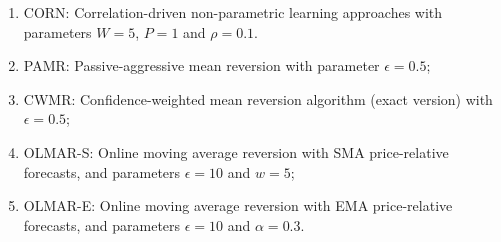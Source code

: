 \begin{enumerate}
  \item CORN: Correlation-driven non-parametric learning approaches \citep{corn} with parameters $W = 5$, $P = 1$ and $\rho = 0.1$.
  \item PAMR: Passive-aggressive mean reversion \citep{pamr} with parameter $\epsilon=0.5$;
  \item CWMR: Confidence-weighted mean reversion \citep{cwmr} algorithm (exact version) with $\epsilon = 0.5$;
  \item OLMAR-S: Online moving average reversion \citep{olmar} with SMA price-relative forecasts, and parameters $\epsilon = 10$ and $w = 5$;
  \item OLMAR-E: Online moving average reversion \citep{olmar} with EMA price-relative forecasts, and parameters $\epsilon = 10$ and $\alpha = 0.3$.
\end{enumerate}
